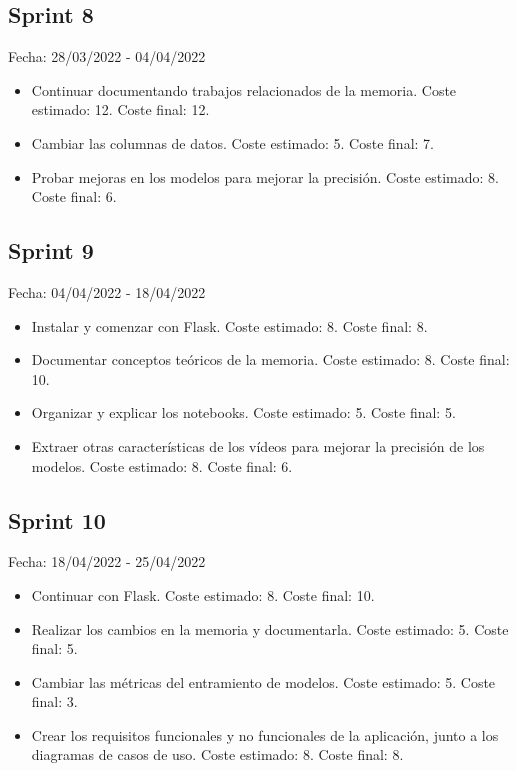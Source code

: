 \subsection{Sprint 8}
Fecha: 28/03/2022 - 04/04/2022
\begin{itemize}
	\item Continuar documentando trabajos relacionados de la memoria. Coste estimado: 12. Coste final: 12.
	\item Cambiar las columnas de datos. Coste estimado: 5. Coste final: 7.
	\item Probar mejoras en los modelos para mejorar la precisión. Coste estimado: 8. Coste final: 6.
\end{itemize}

\subsection{Sprint 9}
Fecha: 04/04/2022 - 18/04/2022
\begin{itemize}
	\item Instalar y comenzar con Flask. Coste estimado: 8. Coste final: 8.
	\item Documentar conceptos teóricos de la memoria. Coste estimado: 8. Coste final: 10.
	\item Organizar y explicar los notebooks. Coste estimado: 5. Coste final: 5.
	\item Extraer otras características de los vídeos para mejorar la precisión de los modelos. Coste estimado: 8. Coste final: 6.
\end{itemize}

\subsection{Sprint 10}
Fecha: 18/04/2022 - 25/04/2022
\begin{itemize}
	\item Continuar con Flask. Coste estimado: 8. Coste final: 10.
	\item Realizar los cambios en la memoria y documentarla. Coste estimado: 5. Coste final: 5.
	\item Cambiar las métricas del entramiento de modelos. Coste estimado: 5. Coste final: 3.
	\item Crear los requisitos funcionales y no funcionales de la aplicación, junto a los diagramas de casos de uso. Coste estimado: 8. Coste final: 8.
\end{itemize}

